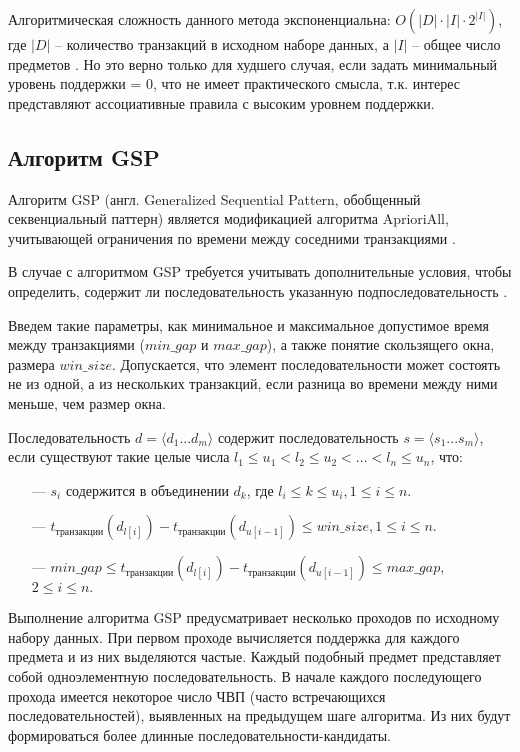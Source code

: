 Алгоритмическая сложность данного метода экспоненциальна: $O(|D| \cdot |I| \cdot 2^{|I|})$, где $|D|$ -- количество транзакций в исходном наборе данных, а $|I|$ -- общее число предметов \cite{Data_mining_book}. Но это верно только для худшего случая, если задать минимальный уровень поддержки = 0, что не имеет практического смысла, т.к. интерес представляют ассоциативные правила с высоким уровнем поддержки.

\subsection{Алгоритм GSP}
Алгоритм GSP (англ. Generalized Sequential Pattern, обобщенный секвенциальный паттерн) является модификацией алгоритма AprioriAll, учитывающей ограничения по времени между соседними транзакциями \cite{1_, 32_}.

В случае с алгоритмом GSP требуется учитывать дополнительные условия, чтобы определить, содержит ли последовательность указанную подпоследовательность \cite{gsp}.

Введем такие параметры, как минимальное и максимальное допустимое время между транзакциями ($min\_gap$ и $max\_gap$), а также понятие скользящего окна, размера $win\_size$. Допускается, что элемент последовательности может состоять не из одной, а из нескольких транзакций, если разница во времени между ними меньше, чем размер окна.

Последовательность $d = \langle d_1...d_m \rangle$ содержит последовательность
$s = \langle s_1...s_m \rangle$, если существуют такие целые числа $l_1 ≤ u_1 < l_2 ≤ u_2 < ... < l_n ≤ u_n$, что:

\begin{enumerate}
	\item[---] $s_i$ содержится в объединении $d_k$, где $l_i ≤ k ≤ u_i, 1 ≤ i ≤ n$.
	\item[---] $t_{\text{транзакции}}(d_{l[i]}) - t_{\text{транзакции}} (d_{u[i-1]}) ≤ win\_size, 1 ≤ i ≤ n.$
	\item[---] $min\_gap ≤ t_{\text{транзакции}}(d_{l[i]}) - t_{\text{транзакции}}(d_{u[i-1]}) ≤ max\_gap,$ \newline $2≤i≤n.$
\end{enumerate}

Выполнение алгоритма GSP предусматривает несколько проходов по исходному набору данных. При первом проходе вычисляется поддержка для каждого предмета и из них выделяются частые. Каждый подобный предмет представляет собой одноэлементную последовательность. В начале каждого последующего прохода имеется некоторое число ЧВП (часто встречающихся последовательностей), выявленных на предыдущем шаге алгоритма. Из них будут формироваться более длинные последовательности-кандидаты.

